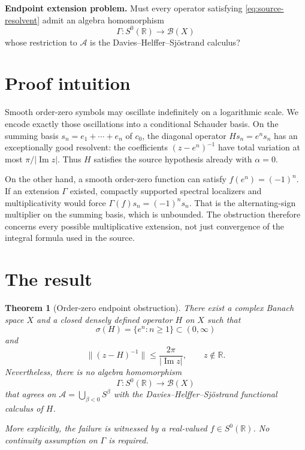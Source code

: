 \documentclass[11pt]{article}
\newtheorem{theorem}{Theorem}
\theoremstyle{remark}
\newcommand{\A}{\mathcal A}
\newcommand{\B}{\mathcal B}
\newcommand{\R}{\mathbb R}
\newcommand{\norm}[1]{\lVert #1\rVert}
\begin{document}
\medskip
\noindent\textbf{Endpoint extension problem.}
Must every operator satisfying \eqref{eq:source-resolvent} admit an algebra
homomorphism
\[
 \Gamma:S^0(\R)\longrightarrow\B(X)
\]
whose restriction to $\A$ is the Davies--Helffer--Sj\"ostrand calculus?

\section{Proof intuition}

Smooth order-zero symbols may oscillate indefinitely on a logarithmic scale.
We encode exactly those oscillations into a conditional Schauder basis.  On
the summing basis $s_n=e_1+\cdots+e_n$ of $c_0$, the diagonal operator
$Hs_n=e^ns_n$ has an exceptionally good resolvent: the coefficients
$(z-e^n)^{-1}$ have total variation at most $\pi/|\operatorname{Im}z|$.
Thus $H$ satisfies the source hypothesis already with $\alpha=0$.

On the other hand, a smooth order-zero function can satisfy
$f(e^n)=(-1)^n$.  If an extension $\Gamma$ existed, compactly supported
spectral localizers and multiplicativity would force
$\Gamma(f)s_n=(-1)^ns_n$.  That is the alternating-sign multiplier on the
summing basis, which is unbounded.  The obstruction therefore concerns every
possible multiplicative extension, not just convergence of the integral
formula used in the source.

\section{The result}

\begin{theorem}[Order-zero endpoint obstruction]\label{thm:main}
There exist a complex Banach space $X$ and a closed densely defined operator
$H$ on $X$ such that
\[
 \sigma(H)=\{e^n:n\geq1\}\subset(0,\infty)
\]
and
\begin{equation}\label{eq:sharp}
 \norm{(z-H)^{-1}}\leq \frac{2\pi}{|\operatorname{Im}z|},
 \qquad z\notin\R.
\end{equation}
Nevertheless, there is no algebra homomorphism
\[
 \Gamma:S^0(\R)\longrightarrow\B(X)
\]
that agrees on $\A=\bigcup_{\beta<0}S^\beta$ with the
Davies--Helffer--Sj\"ostrand functional calculus of $H$.

More explicitly, the failure is witnessed by a real-valued $f\in S^0(\R)$.
No continuity assumption on $\Gamma$ is required.
\end{theorem}
\end{document}
